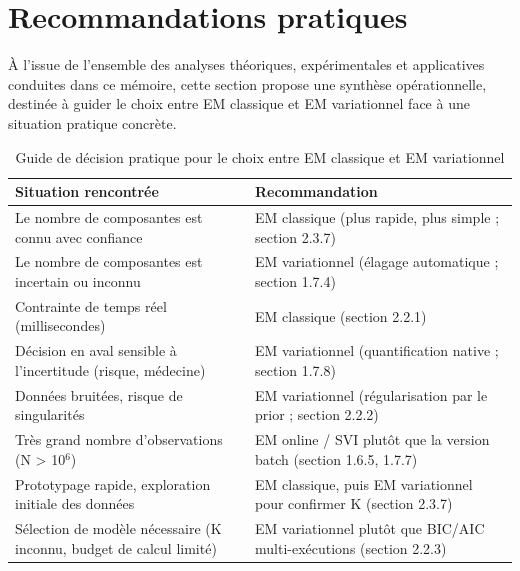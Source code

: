\section{Recommandations pratiques}
À l'issue de l'ensemble des analyses théoriques, expérimentales et applicatives conduites dans ce mémoire, cette section propose une synthèse opérationnelle, destinée à guider le choix entre EM classique et EM variationnel face à une situation pratique concrète.

\begin{table}[H]
\centering
\small
\setlength{\tabcolsep}{0.14cm}
\begin{tabular}{|p{7.42cm}|p{7.42cm}|}
\hline
\textbf{Situation rencontrée} & \textbf{Recommandation} \\
\hline
Le nombre de composantes est connu avec confiance & EM classique (plus rapide, plus simple ; section 2.3.7) \\
\hline
Le nombre de composantes est incertain ou inconnu & EM variationnel (élagage automatique ; section 1.7.4) \\
\hline
Contrainte de temps réel (millisecondes) & EM classique (section 2.2.1) \\
\hline
Décision en aval sensible à l'incertitude (risque, médecine) & EM variationnel (quantification native ; section 1.7.8) \\
\hline
Données bruitées, risque de singularités & EM variationnel (régularisation par le prior ; section 2.2.2) \\
\hline
Très grand nombre d'observations (N > 10$^{6}$) & EM online / SVI plutôt que la version batch (section 1.6.5, 1.7.7) \\
\hline
Prototypage rapide, exploration initiale des données & EM classique, puis EM variationnel pour confirmer K (section 2.3.7) \\
\hline
Sélection de modèle nécessaire (K inconnu, budget de calcul limité) & EM variationnel plutôt que BIC/AIC multi-exécutions (section 2.2.3) \\
\hline
\end{tabular}
\caption{Guide de décision pratique pour le choix entre EM classique et EM variationnel}
\label{tab:3_4}
\end{table}
